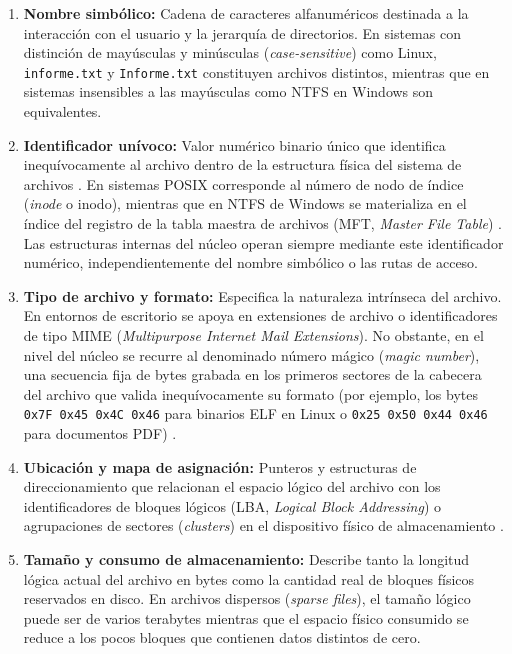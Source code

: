 \documentclass[12pt]{article}
\begin{document}
\begin{enumerate}[noitemsep, topsep=2pt]
    \item \textbf{Nombre simbólico:} Cadena de caracteres alfanuméricos destinada a la interacción con el usuario y la jerarquía de directorios. En sistemas con distinción de mayúsculas y minúsculas (\textit{case-sensitive}) como Linux, \texttt{informe.txt} y \texttt{Informe.txt} constituyen archivos distintos, mientras que en sistemas insensibles a las mayúsculas como NTFS en Windows son equivalentes.
    \item \textbf{Identificador unívoco:} Valor numérico binario único que identifica inequívocamente al archivo dentro de la estructura física del sistema de archivos \parencite[\S 10.1.1, p.\ 334]{silberschatz2006fundamentos}. En sistemas POSIX corresponde al número de nodo de índice (\textit{inode} o inodo), mientras que en NTFS de Windows se materializa en el índice del registro de la tabla maestra de archivos (MFT, \textit{Master File Table}) \parencite[\S 8.2.1, p.\ 422]{carretero2001sistemas}. Las estructuras internas del núcleo operan siempre mediante este identificador numérico, independientemente del nombre simbólico o las rutas de acceso.
    \item \textbf{Tipo de archivo y formato:} Especifica la naturaleza intrínseca del archivo. En entornos de escritorio se apoya en extensiones de archivo o identificadores de tipo MIME (\textit{Multipurpose Internet Mail Extensions}). No obstante, en el nivel del núcleo se recurre al denominado número mágico (\textit{magic number}), una secuencia fija de bytes grabada en los primeros sectores de la cabecera del archivo que valida inequívocamente su formato (por ejemplo, los bytes \texttt{0x7F 0x45 0x4C 0x46} para binarios ELF en Linux o \texttt{0x25 0x50 0x44 0x46} para documentos PDF) \parencite[\S 8.2.1, p.\ 422]{carretero2001sistemas}.
    \item \textbf{Ubicación y mapa de asignación:} Punteros y estructuras de direccionamiento que relacionan el espacio lógico del archivo con los identificadores de bloques lógicos (LBA, \textit{Logical Block Addressing}) o agrupaciones de sectores (\textit{clusters}) en el dispositivo físico de almacenamiento \parencite[\S 8.2.1, p.\ 422]{carretero2001sistemas}.
    \item \textbf{Tamaño y consumo de almacenamiento:} Describe tanto la longitud lógica actual del archivo en bytes como la cantidad real de bloques físicos reservados en disco. En archivos dispersos (\textit{sparse files}), el tamaño lógico puede ser de varios terabytes mientras que el espacio físico consumido se reduce a los pocos bloques que contienen datos distintos de cero.

\end{enumerate}
\end{document}

